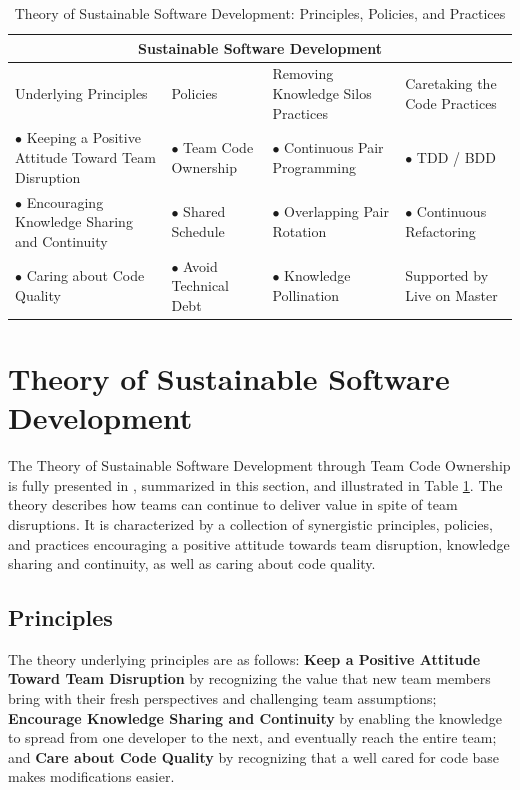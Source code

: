 \begin{table}[]
\renewcommand{\arraystretch}{1.5}
\centering
\caption{Theory of Sustainable Software Development: Principles, Policies, and Practices}
\label{SustainableSoftwareDevelopmentTable}
\begin{tabular}{|p{1.65in}|p{1.6in}|p{1.8in}|p{1.6in}|}
\hline
\multicolumn{4}{c}{Sustainable Software Development}                     \\
\hline
Underlying Principles & Policies                  & Removing Knowledge Silos Practices & Caretaking the Code Practices       \\
$\bullet$ Keeping a Positive Attitude Toward Team Disruption & $\bullet$ Team Code Ownership & $\bullet$ Continuous Pair Programming         & $\bullet$  TDD / BDD                   \\
$\bullet$ Encouraging Knowledge Sharing and Continuity & $\bullet$ Shared Schedule           & $\bullet$ Overlapping Pair Rotation & $\bullet$ Continuous Refactoring      \\
$\bullet$ Caring about Code Quality  & $\bullet$ Avoid Technical Debt      & $\bullet$  Knowledge Pollination    & Supported by Live on Master \\ 
\hline
\end{tabular}
\end{table}

\section{Theory of Sustainable Software Development}
\label{SustainableSoftwareDevelopmentTheory}
The Theory of Sustainable Software Development through Team Code Ownership is fully presented in \cite{SustainableSoftwareDevelopment}, summarized in this section, and illustrated in Table \ref{SustainableSoftwareDevelopmentTable}. The theory describes how teams can continue to deliver value in spite of team disruptions. It is characterized by a collection of synergistic principles, policies, and practices encouraging a positive attitude towards team disruption, knowledge sharing and continuity, as well as caring about code quality. 

\subsection{Principles}
The theory underlying principles are as follows: \textbf{Keep a Positive Attitude Toward Team Disruption} by recognizing the value that new team members bring with their fresh perspectives and challenging team assumptions; \textbf{Encourage Knowledge Sharing and Continuity} by enabling the knowledge to spread from one developer to the next, and eventually reach the entire team; and \textbf{Care about Code Quality} by recognizing that a well cared for code base makes modifications easier. 

